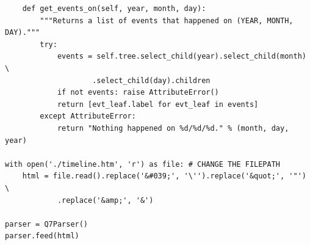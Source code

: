 \documentclass[11pt]{article}
\begin{document}
\begin{lstlisting}
    def get_events_on(self, year, month, day):
        """Returns a list of events that happened on (YEAR, MONTH, DAY)."""
        try:
            events = self.tree.select_child(year).select_child(month) \
                    .select_child(day).children
            if not events: raise AttributeError()
            return [evt_leaf.label for evt_leaf in events]
        except AttributeError:
            return "Nothing happened on %d/%d/%d." % (month, day, year)
            
with open('./timeline.htm', 'r') as file: # CHANGE THE FILEPATH
    html = file.read().replace('&#039;', '\'').replace('&quot;', '"') \
            .replace('&amp;', '&')

parser = Q7Parser()
parser.feed(html)
\end{lstlisting}
\end{document}
